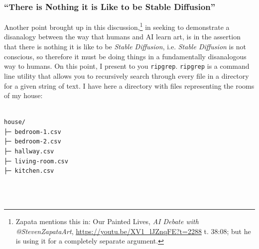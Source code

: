 \documentclass[11pt]{article}
\begin{document}
\subsubsection*{``There is Nothing it is Like to be Stable Diffusion''}
\label{sec:org114a0bf}
Another point brought up in this discussion,\footnote{Zapata mentions this in: Our Painted Lives, \emph{AI Debate with @StevenZapataArt}, \url{https://youtu.be/XV1\_lJZnqFE?t=2288} t. 38:08; but he is using it for a completely separate argument.} in seeking to demonstrate a disanalogy between the way that humans and AI learn art, is in the assertion that there is nothing it is like to be \emph{Stable Diffusion}, i.e. \emph{Stable Diffusion} is not conscious, so therefore it must be doing things in a fundamentally disanalogous way to humans. On this point, I present to you \texttt{ripgrep}. \texttt{ripgrep} is a command line utility that allows you to recursively search through every file in a directory for a given string of text. I have here a directory with files representing the rooms of my house:
\\ \\
\begin{minipage}{\textwidth}
\begin{verbatim}
house/
├─ bedroom-1.csv
├─ bedroom-2.csv
├─ hallway.csv
├─ living-room.csv
├─ kitchen.csv
\end{verbatim}
\end{minipage}
\\ \\
\end{document}
